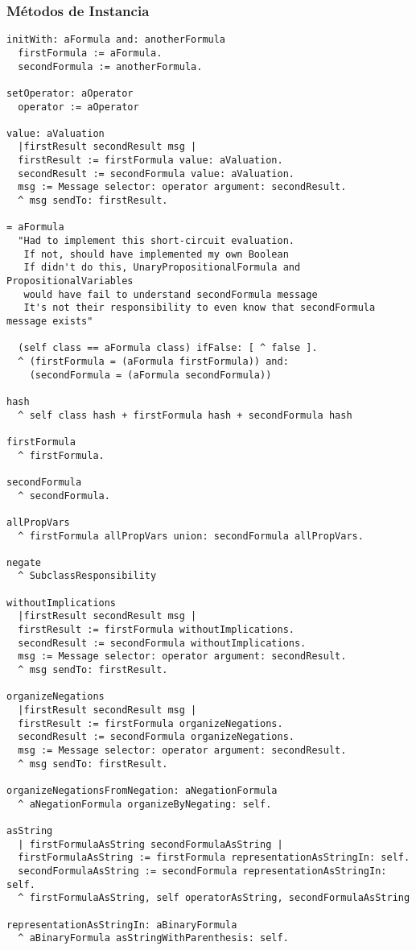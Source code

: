 \documentclass[spanish, 10pt,a4paper]{article}
\numberwithin{equation}{section} %
\begin{document}
\subsubsection{Métodos de Instancia}
\begin{lstlisting}
initWith: aFormula and: anotherFormula
  firstFormula := aFormula. 
  secondFormula := anotherFormula.

setOperator: aOperator
  operator := aOperator

value: aValuation
  |firstResult secondResult msg |
  firstResult := firstFormula value: aValuation.
  secondResult := secondFormula value: aValuation.
  msg := Message selector: operator argument: secondResult.
  ^ msg sendTo: firstResult.

= aFormula
  "Had to implement this short-circuit evaluation. 
   If not, should have implemented my own Boolean
   If didn't do this, UnaryPropositionalFormula and PropositionalVariables 
   would have fail to understand secondFormula message
   It's not their responsibility to even know that secondFormula message exists"

  (self class == aFormula class) ifFalse: [ ^ false ].
  ^ (firstFormula = (aFormula firstFormula)) and: 
	(secondFormula = (aFormula secondFormula))

hash 
  ^ self class hash + firstFormula hash + secondFormula hash

firstFormula
  ^ firstFormula.

secondFormula
  ^ secondFormula.

allPropVars
  ^ firstFormula allPropVars union: secondFormula allPropVars.

negate
  ^ SubclassResponsibility

withoutImplications
  |firstResult secondResult msg |
  firstResult := firstFormula withoutImplications. 
  secondResult := secondFormula withoutImplications.
  msg := Message selector: operator argument: secondResult.
  ^ msg sendTo: firstResult.

organizeNegations
  |firstResult secondResult msg |
  firstResult := firstFormula organizeNegations.
  secondResult := secondFormula organizeNegations.
  msg := Message selector: operator argument: secondResult.
  ^ msg sendTo: firstResult.

organizeNegationsFromNegation: aNegationFormula
  ^ aNegationFormula organizeByNegating: self. 

asString
  | firstFormulaAsString secondFormulaAsString |
  firstFormulaAsString := firstFormula representationAsStringIn: self.
  secondFormulaAsString := secondFormula representationAsStringIn: self.
  ^ firstFormulaAsString, self operatorAsString, secondFormulaAsString

representationAsStringIn: aBinaryFormula
  ^ aBinaryFormula asStringWithParenthesis: self.

\end{lstlisting}
\end{document}
